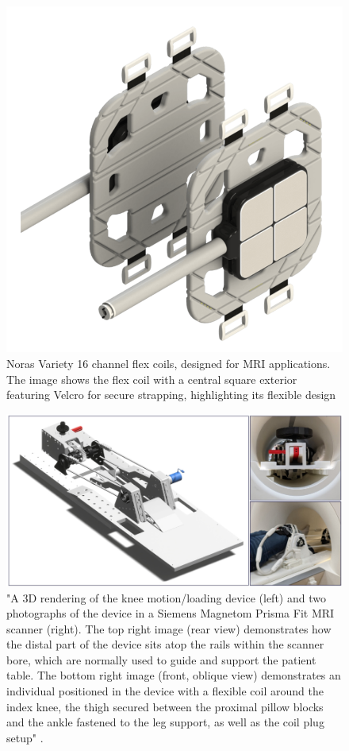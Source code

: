 \documentclass{micro-econ-thesis}
\begin{document}
\begin{figure}[H]
	\centering
	\includegraphics[scale=0.2]{coils}
	\caption{Noras Variety 16 channel flex coils, designed for MRI applications. The image shows the flex coil with a central square exterior featuring Velcro for secure strapping, highlighting its flexible design}
	\label{fig:coils}
\end{figure}


\begin{figure}[H]
	\centering
	\includegraphics[width=0.9\linewidth]{knee_device}
	\caption{"A 3D rendering of the knee motion/loading device (left) and two photographs of the device in a Siemens Magnetom Prisma Fit MRI scanner (right). The top right image (rear view) demonstrates how the distal part of the device sits atop the rails within the scanner bore, which are normally used to guide and support the patient table. The bottom right image (front, oblique view) demonstrates an individual positioned in the device with a flexible coil around the index knee, the thigh secured between the proximal pillow blocks and the ankle fastened to the leg support, as well as the coil plug setup" \parencite{brisson_novel_2022}. }
	\label{fig:kneedevice}
\end{figure}
 
\end{document}
